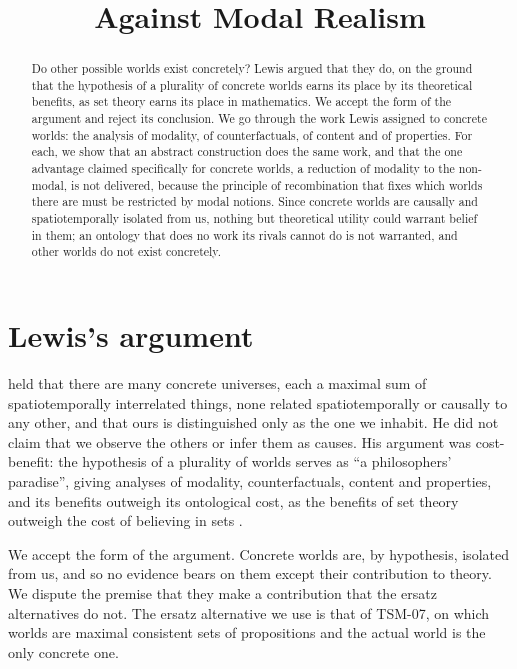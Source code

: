 \documentclass{situationist-preprint}
\title{Against Modal Realism}
\begin{document}
\maketitle

\begin{abstract}
Do other possible worlds exist concretely? Lewis argued that they do, on the ground that the hypothesis of a plurality of concrete worlds earns its place by its theoretical benefits, as set theory earns its place in mathematics. We accept the form of the argument and reject its conclusion. We go through the work Lewis assigned to concrete worlds: the analysis of modality, of counterfactuals, of content and of properties. For each, we show that an abstract construction does the same work, and that the one advantage claimed specifically for concrete worlds, a reduction of modality to the non-modal, is not delivered, because the principle of recombination that fixes which worlds there are must be restricted by modal notions. Since concrete worlds are causally and spatiotemporally isolated from us, nothing but theoretical utility could warrant belief in them; an ontology that does no work its rivals cannot do is not warranted, and other worlds do not exist concretely.
\end{abstract}

\section{Lewis's argument}

\citet{Lewis1986} held that there are many concrete universes, each a maximal sum of spatiotemporally interrelated things, none related spatiotemporally or causally to any other, and that ours is distinguished only as the one we inhabit. He did not claim that we observe the others or infer them as causes. His argument was cost-benefit: the hypothesis of a plurality of worlds serves as \enquote{a philosophers' paradise}, giving analyses of modality, counterfactuals, content and properties, and its benefits outweigh its ontological cost, as the benefits of set theory outweigh the cost of believing in sets \citep[\S1.1]{Lewis1986}.

We accept the form of the argument. Concrete worlds are, by hypothesis, isolated from us, and so no evidence bears on them except their contribution to theory. We dispute the premise that they make a contribution that the ersatz alternatives do not. The ersatz alternative we use is that of TSM-07, on which worlds are maximal consistent sets of propositions and the actual world is the only concrete one.
\end{document}
